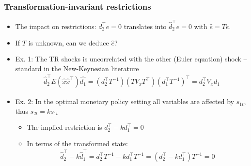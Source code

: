 \documentclass[handout]{beamer}
\begin{document}
\begin{frame}
\frametitle{Transformation-invariant restrictions}

\begin{itemize}  \bigskipamount
    \item The impact on restrictions: $d_2^{\top} e=0$ translates into $\hat{d}^{\top}_2 \hat{e} =0$ with  $\hat{e}=Te.$
  \item If $T$ is unknown, can we deduce $\hat{e}$?
    \item Ex. 1: The TR shocks is uncorrelated with the other (Euler equation) shock -- standard in the New-Keynesian literature
    \begin{eqnarray*}
         \hat{d}_2^{\top} E(\hat{x}\hat{x}^{\top})\hat{d_1}=(d_2^{\top}T^{-1})(TV_xT^{\top})(d_1^{\top}T^{-1})^{\top}=d_2^{\top}V_x d_1
    \end{eqnarray*}
    \item Ex. 2: In the optimal monetary policy setting all variables are affected by $s_{1t},$ thus $s_{2t}=ks_{1t}$
        \begin{itemize}
            \item The implied restriction is $d_2^{\top}-kd_1^{\top}=0$
            \item In terms of the transformed state:
            \begin{eqnarray*}
                 \hat{d}_2^{\top}-k\hat{d}_1^{\top}=d_2^{\top}T^{-1}-kd_1^{\top}T^{-1} = (d_2^{\top}-kd_1^{\top})T^{-1}=0
            \end{eqnarray*}
        \end{itemize}
\end{itemize}

\end{frame}
\end{document}
